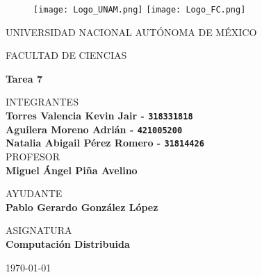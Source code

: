\thispagestyle{empty}

\begin{figure}[ht]
  \texttt{[image: Logo\_UNAM.png]}
  \label{EscudoUNAM}
  \endminipage
  \texttt{[image: Logo\_FC.png]}
  \label{EscudoFC}
  \endminipage
\end{figure}

\begin{center}
  \vspace{0.8cm}
  \LARGE
  UNIVERSIDAD NACIONAL AUTÓNOMA DE MÉXICO

  \vspace{0.7cm}
  \LARGE
  FACULTAD DE CIENCIAS

  \vspace{0.8 cm}
  \Large
  \textbf{Tarea 7}

  \vspace{0.8 cm}
  \normalsize
  INTEGRANTES \\
  \vspace{.2cm}
  \large
  \textbf{Torres Valencia Kevin Jair - \texttt{318331818}}\\
  \textbf{Aguilera Moreno Adrián - \texttt{421005200}}\\
  \textbf{Natalia Abigail Pérez Romero  - \texttt{31814426}}\\

  \vspace{1 cm}
  \normalsize
  PROFESOR \\
  \vspace{.2cm}
  \large
  \textbf{Miguel Ángel Piña Avelino}

  \vspace{1 cm}
  AYUDANTE \\
  \vspace{.2cm}
  \large
  \textbf{Pablo Gerardo González López}
  \vspace{1.3cm}

  \normalsize
  ASIGNATURA \\
  \vspace{.2cm}
  \large
  \textbf{Computación Distribuida}

  \vspace{1 cm}
  \today
\end{center}

